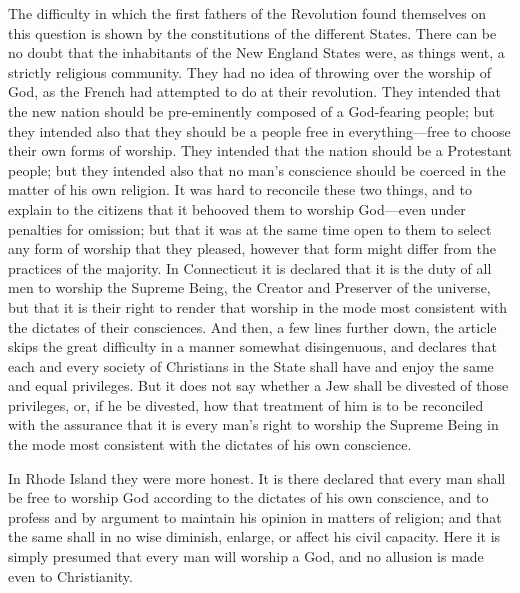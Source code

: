 The difficulty in which the first fathers of the Revolution found
themselves on this question is shown by the constitutions of the
different States.  There can be no doubt that the inhabitants of
the New England States were, as things went, a strictly religious
community.  They had no idea of throwing over the worship of God,
as the French had attempted to do at their revolution.  They
intended that the new nation should be pre-eminently composed of a
God-fearing people; but they intended also that they should be a
people free in everything---free to choose their own forms of
worship.  They intended that the nation should be a Protestant
people; but they intended also that no man's conscience should be
coerced in the matter of his own religion.  It was hard to
reconcile these two things, and to explain to the citizens that it
behooved them to worship God---even under penalties for omission;
but that it was at the same time open to them to select any form of
worship that they pleased, however that form might differ from the
practices of the majority.  In Connecticut it is declared that it
is the duty of all men to worship the Supreme Being, the Creator
and Preserver of the universe, but that it is their right to render
that worship in the mode most consistent with the dictates of their
consciences.  And then, a few lines further down, the article skips
the great difficulty in a manner somewhat disingenuous, and
declares that each and every society of Christians in the State
shall have and enjoy the same and equal privileges.  But it does
not say whether a Jew shall be divested of those privileges, or, if
he be divested, how that treatment of him is to be reconciled with
the assurance that it is every man's right to worship the Supreme
Being in the mode most consistent with the dictates of his own
conscience.

In Rhode Island they were more honest.  It is there declared that
every man shall be free to worship God according to the dictates of
his own conscience, and to profess and by argument to maintain his
opinion in matters of religion; and that the same shall in no wise
diminish, enlarge, or affect his civil capacity.  Here it is simply
presumed that every man will worship a God, and no allusion is made
even to Christianity.

